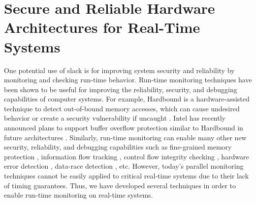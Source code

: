 
\section{Secure and Reliable Hardware Architectures for Real-Time Systems}
\label{sec:intro.security}

One potential use of slack is for improving system security and
reliability by monitoring and checking run-time behavior.
Run-time monitoring techniques have been shown to be useful for improving the
reliability, security, and debugging capabilities of computer systems. For
example, Hardbound is a hardware-assisted technique to detect out-of-bound
memory accesses, which can cause undesired behavior or create a security
vulnerability if uncaught \cite{hardbound-asplos08}. Intel has recently
announced plans to support buffer overflow protection similar to Hardbound in
future architectures \cite{intel-mpx}. Similarly, run-time monitoring can
enable many other new security, reliability, and debugging capabilities such as
fine-grained memory protection \cite{mondrian-asplos02}, information flow
tracking \cite{dift-asplos04, testudo-micro08}, control flow integrity checking
\cite{hafix-dac15}, hardware error detection \cite{argus-micro07}, data-race
detection \cite{radish-isca12, cord-hpca06}, etc.  
However, today's parallel monitoring techniques cannot be easily applied
to critical real-time systems due to their lack of timing guarantees. Thus, we
have developed several techniques in order to enable run-time monitoring on
real-time systems.


